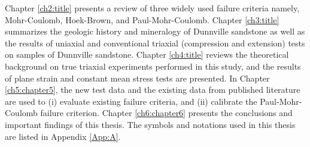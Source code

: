 Chapter \ref{ch2:title} presents a review of three widely used failure criteria namely, Mohr-Coulomb, Hoek-Brown, and Paul-Mohr-Coulomb. Chapter \ref{ch3:title} summarizes the geologic history and mineralogy of Dunnville sandstone as well as the results of uniaxial and conventional triaxial (compression and extension) tests on samples of Dunnville sandstone. Chapter \ref{ch4:title} reviews the theoretical background on true triaxial experiments performed in this study, and the results of plane strain and constant mean stress tests are presented. In Chapter \ref{ch5:chapter5}, the new test data and the existing data from published literature are used to (i) evaluate existing failure criteria, and (ii) calibrate the Paul-Mohr-Coulomb failure criterion. Chapter \ref{ch6:chapter6} presents the conclusions and important findings of this thesis. The symbols and notations used in this thesis are listed in Appendix \ref{App:A}.